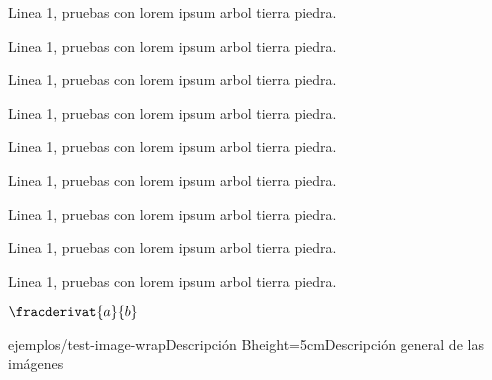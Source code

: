 Linea 1, pruebas con lorem ipsum arbol tierra piedra.


Linea 1, pruebas con lorem ipsum arbol tierra piedra.


Linea 1, pruebas con lorem ipsum arbol tierra piedra.

\insertgathered[\label{gathered1}]{arg2}

Linea 1, pruebas con lorem ipsum arbol tierra piedra.


Linea 1, pruebas con lorem ipsum arbol tierra piedra.


Linea 1, pruebas con lorem ipsum arbol tierra piedra.


Linea 1, pruebas con lorem ipsum arbol tierra piedra.

\insertgatheredcaptioned[\label{gathered3}]{arg2}{}

Linea 1, pruebas con lorem ipsum arbol tierra piedra.


Linea 1, pruebas con lorem ipsum arbol tierra piedra.

\newpage
{}
$\fracderivat{a}{b}$

\newpage

{ejemplos/test-image-wrap}{Descripción B}{height=5cm}{Descripción general de las imágenes}



\newpage
